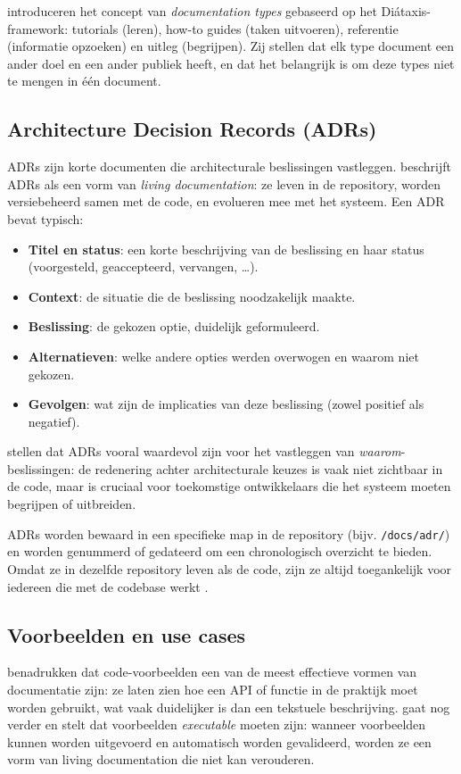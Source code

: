 \textcite{bhatti2021docsdevelopers} introduceren het concept van \textit{documentation types} gebaseerd op het Diátaxis-framework: tutorials (leren), how-to guides (taken uitvoeren), referentie (informatie opzoeken) en uitleg (begrijpen). Zij stellen dat elk type document een ander doel en een ander publiek heeft, en dat het belangrijk is om deze types niet te mengen in één document.

\subsection{Architecture Decision Records (ADRs)}
ADRs zijn korte documenten die architecturale beslissingen vastleggen. \textcite{martraire2019livingdocumentation} beschrijft ADRs als een vorm van \textit{living documentation}: ze leven in de repository, worden versiebeheerd samen met de code, en evolueren mee met het systeem. Een ADR bevat typisch:

\begin{itemize}
    \item \textbf{Titel en status}: een korte beschrijving van de beslissing en haar status (voorgesteld, geaccepteerd, vervangen, \ldots).
    \item \textbf{Context}: de situatie die de beslissing noodzakelijk maakte.
    \item \textbf{Beslissing}: de gekozen optie, duidelijk geformuleerd.
    \item \textbf{Alternatieven}: welke andere opties werden overwogen en waarom niet gekozen.
    \item \textbf{Gevolgen}: wat zijn de implicaties van deze beslissing (zowel positief als negatief).
\end{itemize}

\textcite{bhatti2021docsdevelopers} stellen dat ADRs vooral waardevol zijn voor het vastleggen van \textit{waarom}-beslissingen: de redenering achter architecturale keuzes is vaak niet zichtbaar in de code, maar is cruciaal voor toekomstige ontwikkelaars die het systeem moeten begrijpen of uitbreiden.

ADRs worden bewaard in een specifieke map in de repository (bijv. \texttt{/docs/adr/}) en worden genummerd of gedateerd om een chronologisch overzicht te bieden. Omdat ze in dezelfde repository leven als de code, zijn ze altijd toegankelijk voor iedereen die met de codebase werkt \autocite{gentle2017docslikecode}.

\subsection{Voorbeelden en use cases}
\textcite{bhatti2021docsdevelopers} benadrukken dat code-voorbeelden een van de meest effectieve vormen van documentatie zijn: ze laten zien hoe een API of functie in de praktijk moet worden gebruikt, wat vaak duidelijker is dan een tekstuele beschrijving. \textcite{martraire2019livingdocumentation} gaat nog verder en stelt dat voorbeelden \textit{executable} moeten zijn: wanneer voorbeelden kunnen worden uitgevoerd en automatisch worden gevalideerd, worden ze een vorm van living documentation die niet kan verouderen.

